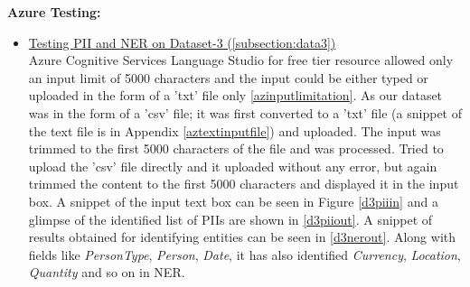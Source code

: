 \textbf{Azure Testing:}
\begin{itemize}
    \item \uline{Testing \acs{PII} and \acs{NER} on Dataset-3 (\ref{subsection:data3})}\\
    Azure Cognitive Services Language Studio for free tier resource allowed only an input limit of 5000 characters and the input could be either typed or uploaded in the form of a 'txt' file only \ref{azinputlimitation}. As our dataset was in the form of a 'csv' file; it was first converted to a 'txt' file (a snippet of the text file is in Appendix \ref{aztextinputfile}) and uploaded. The input was trimmed to the first 5000 characters of the file and was processed. Tried to upload the 'csv' file directly and it uploaded without any error, but again trimmed the content to the first 5000 characters and displayed it in the input box. A snippet of the input text box can be seen in Figure \ref{d3piiin} and a glimpse of the identified list of \acs{PII}s are shown in \ref{d3piiout}. A snippet of results obtained for identifying entities can be seen in \ref{d3nerout}. Along with fields like \textit{PersonType}, \textit{Person}, \textit{Date}, it has also identified \textit{Currency}, \textit{Location}, \textit{Quantity} and so on in \acs{NER}.
    \begin {figure}[h!h]
        \centering

\end{figure}
\end{itemize}
